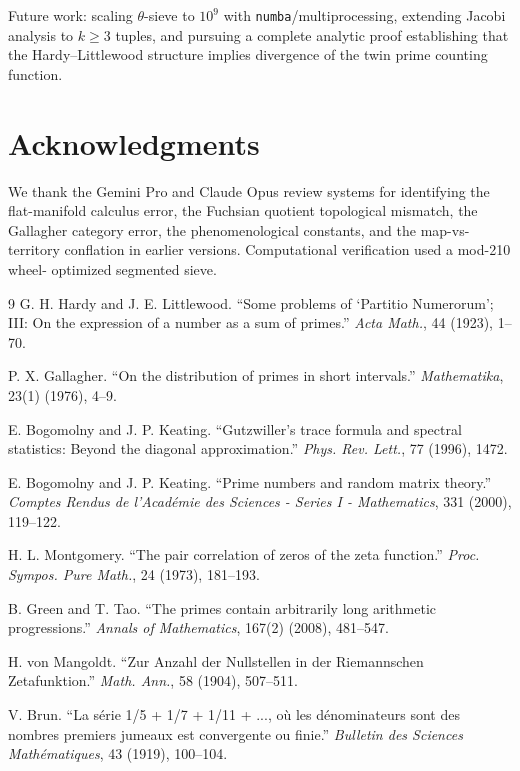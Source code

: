 \documentclass[12pt]{article}
\begin{document}
Future work: scaling $\theta$-sieve to $10^9$ with \texttt{numba}/multiprocessing,
extending Jacobi analysis to $k \geq 3$ tuples, and pursuing a complete analytic
proof establishing that the Hardy--Littlewood structure implies divergence of the
twin prime counting function.

\section*{Acknowledgments}

We thank the Gemini Pro and Claude Opus review systems for identifying the
flat-manifold calculus error, the Fuchsian quotient topological mismatch, the
Gallagher category error, the phenomenological constants, and the map-vs-territory
conflation in earlier versions. Computational verification used a mod-210 wheel-
optimized segmented sieve.


\begin{thebibliography}{9}
G. H. Hardy and J. E. Littlewood.
``Some problems of `Partitio Numerorum'; III: On the expression of a number
as a sum of primes.''
\emph{Acta Math.}, 44 (1923), 1--70.

P. X. Gallagher.
``On the distribution of primes in short intervals.''
\emph{Mathematika}, 23(1) (1976), 4--9.

E. Bogomolny and J. P. Keating.
``Gutzwiller's trace formula and spectral statistics: Beyond the diagonal
approximation.''
\emph{Phys. Rev. Lett.}, 77 (1996), 1472.

E. Bogomolny and J. P. Keating.
``Prime numbers and random matrix theory.''
\emph{Comptes Rendus de l'Académie des Sciences - Series I - Mathematics}, 331 (2000), 119--122.

H. L. Montgomery.
``The pair correlation of zeros of the zeta function.''
\emph{Proc. Sympos. Pure Math.}, 24 (1973), 181--193.

B. Green and T. Tao.
``The primes contain arbitrarily long arithmetic progressions.''
\emph{Annals of Mathematics}, 167(2) (2008), 481--547.

H. von Mangoldt.
``Zur Anzahl der Nullstellen in der Riemannschen Zetafunktion.''
\emph{Math. Ann.}, 58 (1904), 507--511.

V. Brun.
``La série 1/5 + 1/7 + 1/11 + ..., où les dénominateurs sont des nombres
premiers jumeaux est convergente ou finie.''
\emph{Bulletin des Sciences Mathématiques}, 43 (1919), 100--104.

\end{thebibliography}
\end{document}
